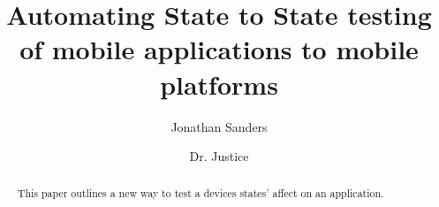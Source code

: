 \documentclass[sigconf]{acmart}
\begin{document}
\title{Automating State to State testing of mobile applications to mobile platforms}

\author{Jonathan Sanders}

\author{Dr. Justice}





\begin{abstract}
This paper outlines a new way to test a devices states' affect on an application.  
\end{abstract}





\maketitle




 
\end{document}

